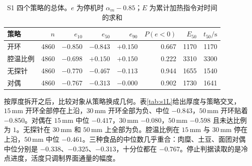 \begin{table}[t]
\centering
\caption{S1 四个策略的总体。\(e\) 为停机时 \(\alpha_m-0.85\)；\(E\) 为累计加热指令对时间的求和}
\label{tab:s1}
\setlength{\tabcolsep}{4.2pt}
{\small
\begin{tabular}{lrrrrrrr}
\toprule
策略 & \(n\) & \(e_{10}\) & \(e_{50}\) & \(e_{90}\) & \(P(e{<}0)\) & \(E_{50}\) & \(t_{50}/\mathrm{s}\) \\
\midrule
开环 & 4860 & \(-0.850\) & \(-0.843\) & \(+0.150\) & 0.667 & 1170 & 1170 \\
腔温比例 & 4860 & \(-0.698\) & \(+0.150\) & \(+0.150\) & 0.222 & 3310 & 3300 \\
无探针 & 4860 & \(-0.770\) & \(-0.467\) & \(-0.113\) & 0.944 & 1655 & 1540 \\
对偶 & 4860 & \(-0.767\) & \(-0.313\) & \(-0.000\) & 0.902 & 1730 & 1641 \\
\bottomrule
\end{tabular}}
\end{table}

按厚度拆开之后，比较对象从策略换成几何。表\ref{tab:s1L}{}给出厚度与策略交叉，\(15\,\mathrm{mm}\) 开环全部停在上沿，\(30\,\mathrm{mm}\) 开环全部为负、中位 \(-0.843\)，\(50\,\mathrm{mm}\) 开环贴着 \(-0.850\)。对偶在 \(15\,\mathrm{mm}\) 中位 \(-0.417\)，\(30\,\mathrm{mm}\) \(-0.080\)，\(50\,\mathrm{mm}\) \(-0.598\) 且未达比例为 \(1\)。无探针在 \(30\,\mathrm{mm}\) 和 \(50\,\mathrm{mm}\) 上全部为负。腔温比例在 \(15\,\mathrm{mm}\) 与 \(30\,\mathrm{mm}\) 停在上沿，\(50\,\mathrm{mm}\) 中位 \(-0.461\)。三种食品的中位数几乎重合：肉糜、土豆、面团对偶中位分别是 \(-0.338\)、\(-0.325\)、\(-0.313\)，十分位都在 \(-0.767\)。停止判据读取的是冷点进度，活度只调制界面通量的幅度。

